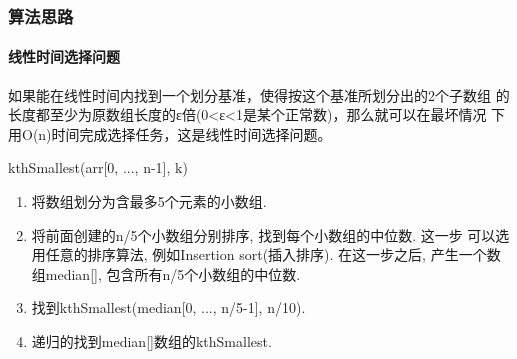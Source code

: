 \subsubsection{算法思路}
\paragraph{线性时间选择问题}
如果能在线性时间内找到一个划分基准，使得按这个基准所划分出的2个子数组
的长度都至少为原数组长度的ε倍(0<ε<1是某个正常数)，那么就可以在最坏情况
下用O(n)时间完成选择任务，这是线性时间选择问题。\par
kthSmallest(arr[0, ..., n-1], k)
\begin{enumerate}
	\item 将数组划分为含最多5个元素的小数组.
	\item 将前面创建的n/5个小数组分别排序, 找到每个小数组的中位数. 这一步
	      可以选用任意的排序算法, 例如Insertion sort(插入排序). 在这一步之后,
	      产生一个数组median[], 包含所有n/5个小数组的中位数.
	\item 找到kthSmallest(median[0, ..., n/5-1], n/10).
	\item 递归的找到median[]数组的kthSmallest.
\end{enumerate}

